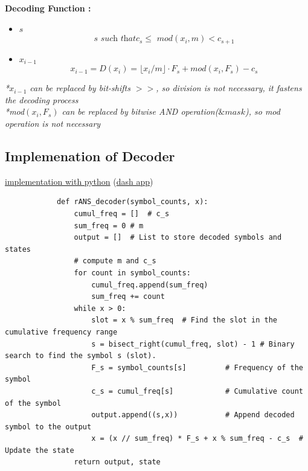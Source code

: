     \begin{frame}[fragile]{}
        \textbf{Decoding Function  :}
        \begin{itemize}
            \item $\mathit{s}$ $$ \mathit{s \text{ such that} c_s \leq \text{ mod} (x_i, m) < c_{s+1}} $$
            \item $\mathit{x_{i-1}}$ $$ \mathit{ x_{i-1} = D(x_i)= \lfloor x_i/m \rfloor \cdot F_s + \text{mod}(x_i, F_s) - c_s} $$
        \end{itemize}
        \textit{*$\mathit{x_{i-1}}$ can be replaced by bit-shifts $>>$, so division is not necessary, it fastens the decoding process \\ *mod$\mathit{(x_i, F_s)}$ can be replaced by bitwise AND operation($\& mask$), so mod operation is not necessary}
    \end{frame}
    
\subsection{Implemenation of Decoder}
    \begin{frame}[fragile]{}
        \href{http://localhost:8050}{implementation with python} (\href{https://github.com/hurryclear/cs_theory/tree/data_compression/24ws_data_compression/implementation}{dash app})
        \begin{verbatim}
            def rANS_decoder(symbol_counts, x):
                cumul_freq = []  # c_s
                sum_freq = 0 # m
                output = []  # List to store decoded symbols and states
                # compute m and c_s
                for count in symbol_counts:
                    cumul_freq.append(sum_freq)
                    sum_freq += count
                while x > 0:
                    slot = x % sum_freq  # Find the slot in the cumulative frequency range
                    s = bisect_right(cumul_freq, slot) - 1 # Binary search to find the symbol s (slot).
                    F_s = symbol_counts[s]         # Frequency of the symbol
                    c_s = cumul_freq[s]            # Cumulative count of the symbol
                    output.append((s,x))           # Append decoded symbol to the output
                    x = (x // sum_freq) * F_s + x % sum_freq - c_s  # Update the state
                return output, state
        \end{verbatim}
    \end{frame}
